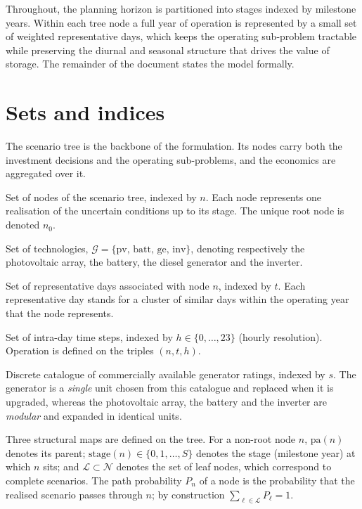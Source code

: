 \documentclass[11pt,a4paper]{article}
\theoremstyle{plain}
\theoremstyle{definition}
\newcommand{\pa}{\mathrm{pa}}
\begin{document}
Throughout, the planning horizon is partitioned into stages indexed by milestone years.
Within each tree node a full year of operation is represented by a small set of
weighted representative days, which keeps the operating sub-problem tractable while
preserving the diurnal and seasonal structure that drives the value of storage. The
remainder of the document states the model formally.

\section{Sets and indices}
\label{sec:sets}

The scenario tree is the backbone of the formulation. Its nodes carry both the
investment decisions and the operating sub-problems, and the economics are aggregated
over it.

\begin{description}[leftmargin=2.2cm,style=nextline]
  \item[$\mathcal{N}$] Set of nodes of the scenario tree, indexed by $n$. Each node
  represents one realisation of the uncertain conditions up to its stage. The unique
  root node is denoted $n_0$.
  \item[$\mathcal{G}$] Set of technologies, $\mathcal{G}=\{\mathrm{pv},\,
  \mathrm{batt},\,\mathrm{ge},\,\mathrm{inv}\}$, denoting respectively the photovoltaic
  array, the battery, the diesel generator and the inverter. 
  \item[$\mathcal{T}_n$] Set of representative days associated with node $n$, indexed by
  $t$. Each representative day stands for a cluster of similar days within the operating
  year that the node represents.
  \item[$\mathcal{H}$] Set of intra-day time steps, indexed by $h\in\{0,\dots,23\}$
  (hourly resolution). Operation is defined on the triples $(n,t,h)$.
  \item[$\mathcal{S}_{\mathrm{ge}}$] Discrete catalogue of commercially available
  generator ratings, indexed by $s$. The generator is a \emph{single} unit chosen from
  this catalogue and replaced when it is upgraded, whereas the photovoltaic array, the
  battery and the inverter are \emph{modular} and expanded in identical units.
\end{description}

Three structural maps are defined on the tree. For a non-root node $n$, $\pa(n)$ denotes
its parent; $\mathrm{stage}(n)\in\{0,1,\dots,S\}$ denotes the stage (milestone year) at
which $n$ sits; and $\mathcal{L}\subset\mathcal{N}$ denotes the set of leaf nodes, which
correspond to complete scenarios. The path probability $P_n$ of a node is the
probability that the realised scenario passes through $n$; by construction
$\sum_{\ell\in\mathcal{L}}P_\ell=1$.
\end{document}
